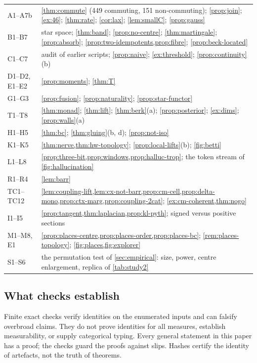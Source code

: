 \documentclass[11pt]{article}
\theoremstyle{definition}
\begin{document}
\begin{center}\small
\begin{tabular}{>{\raggedright}p{1.7cm}>{\raggedright\arraybackslash}p{12.6cm}}\toprule
A1--A7b & \cref{thm:commute} (449 commuting, 151 non-commuting); \cref{prop:join}; \cref{ex:46}; \cref{thm:rate}; \cref{cor:lax};
  \cref{lem:smallC}; \cref{prop:gauss}\\
B1--B7 & star space; \cref{thm:band}; \cref{prop:no-centre}; \cref{thm:martingale}; \cref{prop:absorb};
  \cref{prop:two-idempotents,prop:fibre}; \cref{prop:beck-located}\\
C1--C7 & audit of earlier scripts; \cref{prop:naive}; \cref{ex:threshold}; \cref{prop:continuity}(b)\\
D1--D2, E1--E2 & \cref{prop:moments}; \cref{thm:T}\\
G1--G3 & \cref{prop:fusion}; \cref{prop:naturality}; \cref{prop:star-functor}\\
T1--T8 & \cref{thm:monad}; \cref{thm:lift}; \cref{thm:berk}(a); \cref{prop:posterior}; \cref{ex:dims}; \cref{prop:walls}(a)\\
H1--H5 & \cref{thm:bc}; \cref{thm:gluing}(b, d); \cref{prop:not-iso}\\
K1--K5 & \cref{thm:nerve,thm:hw-topology}; \cref{prop:local-lifts}(b); \cref{fig:betti}\\
L1--L8 & \cref{prop:three-bit,prop:windows,prop:halluc-trop}; the token stream of \cref{fig:hallucination}\\
R1--R4 & \cref{lem:barr}\\
TC1--TC12 & \cref{lem:coupling-lift,lem:cx-not-barr,prop:cm-cell,prop:delta-mono,prop:ctx-marg,prop:coupling-2cat}; \cref{ex:cm-coherent,thm:nogo}\\
I1--I5 & \cref{prop:tangent,thm:laplacian,prop:kl-pyth}; signed versus positive sections\\
M1--M8, E1 & \cref{prop:places-centre,prop:places-order,prop:places-bc}; \cref{rem:places-topology}; \cref{fig:places,fig:explorer}\\
S1--S6 & the permutation test of \cref{sec:empirical}: size, power, centre enlargement, replica of \cref{tab:study2}\\
\bottomrule
\end{tabular}
\end{center}

\subsection{What checks establish}
Finite exact checks verify identities on the enumerated inputs and can falsify overbroad claims. They do not prove identities for all
measures, establish measurability, or supply categorical typing. Every general statement in this paper has a proof; the checks guard
the proofs against slips. Hashes certify the identity of artefacts, not the truth of theorems.
\end{document}
